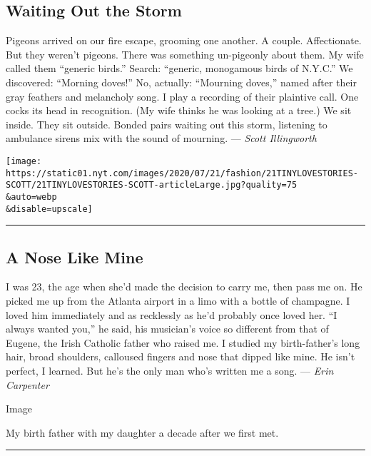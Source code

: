 \hypertarget{waiting-out-the-storm}{%
\subsection{Waiting Out the Storm}\label{waiting-out-the-storm}}

Pigeons arrived on our fire escape, grooming one another. A couple.
Affectionate. But they weren't pigeons. There was something un-pigeonly
about them. My wife called them ``generic birds.'' Search: ``generic,
monogamous birds of N.Y.C.'' We discovered: ``Morning doves!'' No,
actually: ``Mourning doves,'' named after their gray feathers and
melancholy song. I play a recording of their plaintive call. One cocks
its head in recognition. (My wife thinks he was looking at a tree.) We
sit inside. They sit outside. Bonded pairs waiting out this storm,
listening to ambulance sirens mix with the sound of mourning. ---
\emph{Scott Illingworth}

\texttt{[image: https://static01.nyt.com/images/2020/07/21/fashion/21TINYLOVESTORIES-SCOTT/21TINYLOVESTORIES-SCOTT-articleLarge.jpg?quality=75\\\&auto=webp\\\&disable=upscale]}

\begin{center}\rule{0.5\linewidth}{\linethickness}\end{center}

\hypertarget{a-nose-like-mine}{%
\subsection{A Nose Like Mine}\label{a-nose-like-mine}}

I was 23, the age when she'd made the decision to carry me, then pass me
on. He picked me up from the Atlanta airport in a limo with a bottle of
champagne. I loved him immediately and as recklessly as he'd probably
once loved her. ``I always wanted you,'' he said, his musician's voice
so different from that of Eugene, the Irish Catholic father who raised
me. I studied my birth-father's long hair, broad shoulders, calloused
fingers and nose that dipped like mine. He isn't perfect, I learned. But
he's the only man who's written me a song. --- \emph{Erin Carpenter}

Image

My birth father with my daughter a decade after we first met.

\begin{center}\rule{0.5\linewidth}{\linethickness}\end{center}

